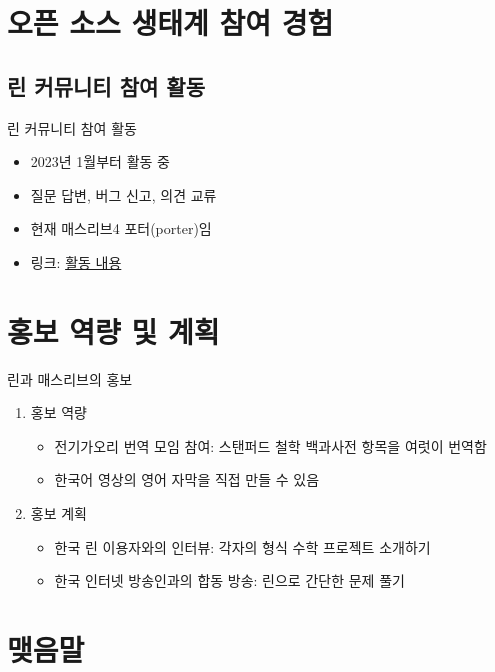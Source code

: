 \documentclass{beamer}
\begin{document}
\section{오픈 소스 생태계 참여 경험}

\subsection{린 커뮤니티 참여 활동}

\begin{frame}{린 커뮤니티 참여 활동}
  \begin{itemize}
    \item 2023년 1월부터 활동 중
    \item 질문 답변, 버그 신고, 의견 교류
    \item 현재 매스리브4 포터(porter)임
    \item 링크: \href{https://leanprover.zulipchat.com/\#narrow/sender/417769-Bulhwi-Cha}{활동 내용}
  \end{itemize}
\end{frame}

\section{홍보 역량 및 계획}

\begin{frame}{린과 매스리브의 홍보}
  \begin{enumerate}
    \item 홍보 역량
      \begin{itemize}
        \item 전기가오리 번역 모임 참여: 스탠퍼드 철학 백과사전 항목을 여럿이 번역함
        \item 한국어 영상의 영어 자막을 직접 만들 수 있음
      \end{itemize}
    \item 홍보 계획
      \begin{itemize}
        \item 한국 린 이용자와의 인터뷰: 각자의 형식 수학 프로젝트 소개하기
        \item 한국 인터넷 방송인과의 합동 방송: 린으로 간단한 문제 풀기
      \end{itemize}
  \end{enumerate}
\end{frame}

\section{맺음말}
\end{document}

